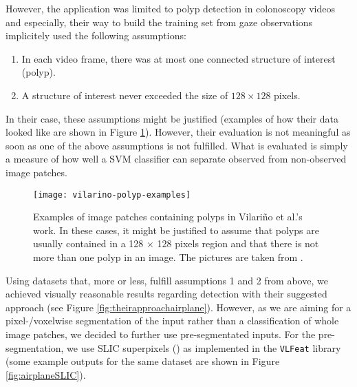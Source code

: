 However, the application was limited to polyp detection in colonoscopy videos and especially, their way to build the training set from gaze observations implicitely used the following assumptions:
\begin{enumerate}
 \item In each video frame, there was at most one connected structure of interest (polyp).
 \item A structure of interest never exceeded the size of $128 \times 128$ pixels.
\end{enumerate}
In their case, these assumptions might be justified (examples of how their data looked like are shown in Figure \ref{fig:vilarinoPolypExamples}). However, their evaluation is not meaningful as soon as one of the above assumptions is not fulfilled. What is evaluated is simply a measure of how well a SVM classifier can separate observed from non-observed image patches. 

\begin{figure}[ht]
	\centering
	\texttt{[image: vilarino-polyp-examples]}
	\caption{Examples of image patches containing polyps in Vilari\~no et al.'s work. In these cases, it might be justified to assume that polyps are usually contained in a 128 $\times$ 128 pixels region and that there is not more than one polyp in an image. The pictures are taken from \cite{vilarino2007automatic}.}
	\label{fig:vilarinoPolypExamples}
\end{figure}
Using datasets that, more or less, fulfill assumptions 1 and 2 from above, we achieved visually reasonable results regarding detection with their suggested approach (see Figure \ref{fig:theirapproachairplane}). However, as we are aiming for a pixel-/voxelwise segmentation of the input rather than a classification of whole image patches, we decided to further use pre-segmentated inputs. For the pre-segmentation, we use SLIC superpixels (\cite{achanta2010slic}) as implemented in the {\tt VLFeat} library \cite{vedaldi08vlfeat} (some example outputs for the same dataset are shown in Figure \ref{fig:airplaneSLIC}). 

